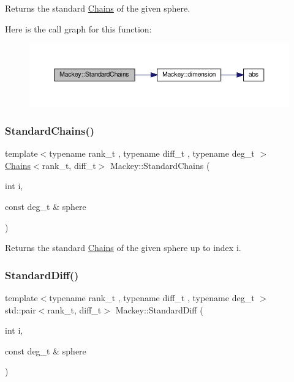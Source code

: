 Returns the standard \hyperlink{classMackey_1_1Chains}{Chains} of the given sphere. 

Here is the call graph for this function\+:\nopagebreak
\begin{figure}[H]
\begin{center}
\leavevmode
\includegraphics[width=350pt]{namespaceMackey_a425b988266cedec0299fb539d99179b1_cgraph}
\end{center}
\end{figure}
\mbox{\label{namespaceMackey_aac9deeccbe291d1dd17df46a3d7c1f2b}} 
\subsubsection{\texorpdfstring{Standard\+Chains()}{StandardChains()}\hspace{0.1cm}{\footnotesize\ttfamily [2/2]}}
{\footnotesize\ttfamily template$<$typename rank\+\_\+t , typename diff\+\_\+t , typename deg\+\_\+t $>$ \\
\hyperlink{classMackey_1_1Chains}{Chains}$<$rank\+\_\+t, diff\+\_\+t$>$ Mackey\+::\+Standard\+Chains (\begin{DoxyParamCaption}\item[{int}]{i,  }\item[{const deg\+\_\+t \&}]{sphere }\end{DoxyParamCaption})}



Returns the standard \hyperlink{classMackey_1_1Chains}{Chains} of the given sphere up to index i. 

\mbox{\label{namespaceMackey_a4b31e1685ed5771bcced308b3b13c7f0}} 
\subsubsection{\texorpdfstring{Standard\+Diff()}{StandardDiff()}}
{\footnotesize\ttfamily template$<$typename rank\+\_\+t , typename diff\+\_\+t , typename deg\+\_\+t $>$ \\
std\+::pair$<$rank\+\_\+t, diff\+\_\+t$>$ Mackey\+::\+Standard\+Diff (\begin{DoxyParamCaption}\item[{int}]{i,  }\item[{const deg\+\_\+t \&}]{sphere }\end{DoxyParamCaption})}



